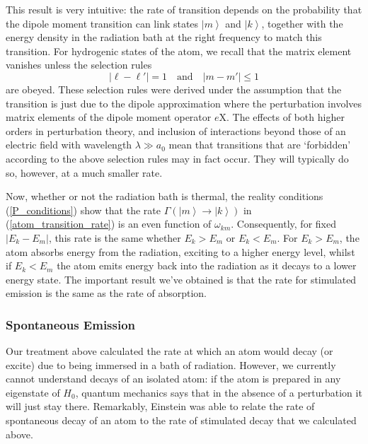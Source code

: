 \documentclass{article}
\theoremstyle{plain}\theoremheaderfont{\normalfont\itshape}\theorembodyfont{\rmfamily}\theoremseparator{.}\newtheorem*{rem}{Remark}\newtheorem*{ex}{Example}\newtheorem*{proof}{Proof}\newtheorem*{altp}{Alternative proof}
\theoremstyle{plain}\theoremheaderfont{\normalfont\bfseries}\theorembodyfont{\rmfamily}\theoremseparator{.}\newtheorem{thm}{Theorem}[section]\newtheorem{lem}[thm]{Lemma}\newtheorem{prop}[thm]{Proposition}\newtheorem*{cor}{Corollary}\newtheorem{defn}[thm]{Definition}\newtheorem{clm}[thm]{Claim}\newtheorem{clminproof}{Claim}
\theoremstyle{break}\theoremheaderfont{\normalfont\itshape}\theorembodyfont{\rmfamily}\theoremseparator{.\medskip}\newtheorem*{proofskip}{Proof}\newtheorem*{exs}{Examples}\newtheorem*{rems}{Remarks}
\theoremstyle{break}\theoremheaderfont{\normalfont\bfseries}\theorembodyfont{\rmfamily}\theoremseparator{.\medskip}\newtheorem{lemskip}[thm]{Lemma}\newtheorem{defnskip}[thm]{Definition}\newtheorem{propskip}[thm]{Proposition}\newtheorem{thmskip}[thm]{Theorem}
\numberwithin{equation}{section}
\newcommand{\ket}[1]{\left| #1 \right\rangle}
\newcommand{\vb}[1]{\bm{\mathrm{#1}}}
\newcommand{\abs}[1]{\left| #1 \right|}
\begin{document}
    This result is very intuitive: the rate of transition depends on the probability that the dipole moment transition can link states \(\ket{m}\) and \(\ket{k}\), together with the energy density in the radiation bath at the right frequency to match this transition. For hydrogenic states of the atom, we recall that the matrix element vanishes unless the selection rules
    \begin{equation}
        \abs{\ell-\ell'}=1\quad\text{and}\quad\abs{m-m'}\le 1
    \end{equation}
    are obeyed. These selection rules were derived under the assumption that the transition is just due to the dipole approximation where the perturbation involves matrix elements of the dipole moment operator \(e\vb{X}\). The effects of both higher orders in perturbation theory, and inclusion of interactions beyond those of an electric field with wavelength \(\lambda\gg a_0\) mean that transitions that are `forbidden' according to the above selection rules may in fact occur. They will typically do so, however, at a much smaller rate.

    Now, whether or not the radiation bath is thermal, the reality conditions (\ref{P_conditions}) show that the rate \(\Gamma(\ket{m}\to\ket{k})\) in (\ref{atom_transition_rate}) is an even function of \(\omega_{km}\). Consequently, for fixed \(\abs{E_k-E_m}\), this rate is the same whether \(E_k>E_m\) or \(E_k<E_m\). For \(E_k>E_m\), the atom absorbs energy from the radiation, exciting to a higher energy level, whilst if \(E_k<E_m\) the atom emits energy back into the radiation as it decays to a lower energy state. The important result we've obtained is that the rate for stimulated emission is the same as the rate of absorption.
    
    \subsubsection{Spontaneous Emission}
    Our treatment above calculated the rate at which an atom would decay (or excite) due to being immersed in a bath of radiation. However, we currently cannot understand decays of an isolated atom: if the atom is prepared in any eigenstate of \(H_0\), quantum mechanics says that in the absence of a perturbation it will just stay there. Remarkably, Einstein was able to relate the rate of spontaneous decay of an atom to the rate of stimulated decay that we calculated above.
\end{document}
